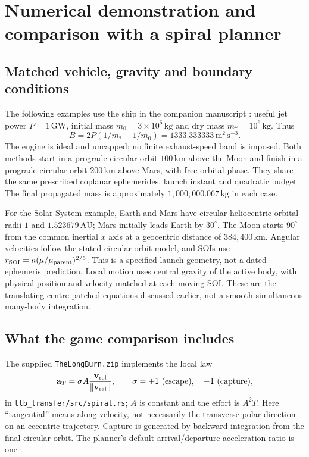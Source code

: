 \documentclass[journal, a4paper]{IEEEtran}
\newcommand{\norm}[1]{\left\lVert#1\right\rVert}
\begin{document}
\section{Numerical demonstration and comparison with a spiral planner}
\label{sec:demonstration}
\subsection{Matched vehicle, gravity and boundary conditions}
The following examples use the ship in the companion manuscript \cite{companion}: useful jet power $P=1\,\mathrm{GW}$, initial mass $m_0=3\times10^6\,\mathrm{kg}$ and dry mass $m_*=10^6\,\mathrm{kg}$. Thus
\begin{equation}
 B=2P(1/m_*-1/m_0)=1333.333333\,\mathrm{m^2\,s^{-3}}.
\end{equation}
The engine is ideal and uncapped; no finite exhaust-speed band is imposed. Both methods start in a prograde circular orbit $100\,\mathrm{km}$ above the Moon and finish in a prograde circular orbit $200\,\mathrm{km}$ above Mars, with free orbital phase. They share the same prescribed coplanar ephemerides, launch instant and quadratic budget. The final propagated mass is approximately $1{,}000{,}000.067\,\mathrm{kg}$ in each case.

For the Solar-System example, Earth and Mars have circular heliocentric orbital radii $1$ and $1.523679\,\mathrm{AU}$; Mars initially leads Earth by $30^\circ$. The Moon starts $90^\circ$ from the common inertial $x$ axis at a geocentric distance of $384{,}400\,\mathrm{km}$. Angular velocities follow the stated circular-orbit model, and SOIs use $r_{\rm SOI}=a(\mu/\mu_{\rm parent})^{2/5}$. This is a specified launch geometry, not a dated ephemeris prediction. Local motion uses central gravity of the active body, with physical position and velocity matched at each moving SOI. These are the translating-centre patched equations discussed earlier, not a smooth simultaneous many-body integration.

\subsection{What the game comparison includes}
The supplied \texttt{TheLongBurn.zip} implements the local law
\begin{equation}
 \mathbf a_T=\sigma A\frac{\mathbf v_{\rm rel}}{\norm{\mathbf v_{\rm rel}}},
 \qquad \sigma=+1\ \hbox{(escape)},\quad -1\ \hbox{(capture)},
 \label{eq:game-law}
\end{equation}
in \texttt{tlb\_transfer/src/spiral.rs}; $A$ is constant and the effort is $A^2T$. Here ``tangential'' means along velocity, not necessarily the transverse polar direction on an eccentric trajectory. Capture is generated by backward integration from the final circular orbit. The planner's default arrival/departure acceleration ratio is one \cite{longburn}.
\end{document}
